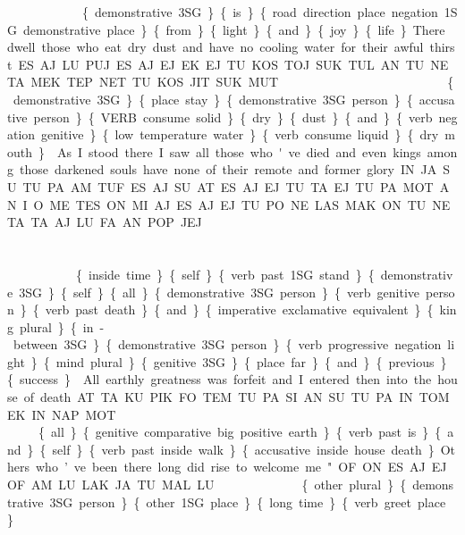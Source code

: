 {\es\aj \si \lol\li\lu\Atlanne\am\es\lu \pu \las \an \sus \fin

\{demonstrative 3SG\} \{is\} \{road direction place negation 1SG demonstrative place\} \{from\} \{light\} \{and\} \{joy\} \{life\} 

 
 

There dwell those who eat dry dust and have no cooling water for their awful thirst.  
 ES.AJ LU.PUJ ES.AJ.EJ EK.EJ TU.KOS.TOJ SUK TUL AN TU.NE.TA MEK.TEP.NET TU.KOS.JIT SUK.MUT 

\es\aj \lu\puj \es\aj\ej \ek\ek \tu\kos\toj \suk \tul \an \tu\Atlanne\ta \mek\tep\net \tu\kos\jit \suk\mut

\{demonstrative 3SG\} \{place stay\} \{demonstrative 3SG person\} \{accusative person\} \{VERB consume solid\} \{dry\} \{dust\} \{and\} \{verb negation genitive\} \{low temperature water\} \{verb consume liquid\} \{dry mouth\} 

 
 

 
 
\pagebreak
As I stood there I saw all those who've died and even kings among those darkened souls have none of their remote and former glory. 

IN.JA SU TU.PA.AM.TUF ES.AJ SU AT ES.AJ.EJ TU.TA.EJ TU.PA.MOT AN I.O.ME TES.ON MI.AJ ES.AJ.EJ TU.PO.NE.LAS MAK.ON TU.NE.TA TA.AJ LU.FA AN POP JEJ 

\Atlanin\ja \su \tu\pa\am\tuf \es\aj \su \at \es\aj\ej \\\tu\ta\ej \tu\pa\mot \an \Atlani\Atlano\me \\ \tes\on \mi\aj \es\aj\ej \tu\po\Atlanne\las \mak\on \\ \tu\Atlanne\ta \ta\taj \lu\fa \an \pop \jej


\{inside time\} \{self\} \{verb past 1SG stand\} \{demonstrative 3SG\} \{self\} \{all\} \{demonstrative 3SG person\} \{verb genitive person\} \{verb past death\} \{and\} \{imperative exclamative equivalent\} \{king plural\} \{in-between 3SG\} \{demonstrative 3SG person\} \{verb progressive negation light\} \{mind plural\} \{genitive 3SG\} \{place far\} \{and\} \{previous\} \{success\} 

 
\drie 

All earthly greatness was forfeit and I entered then into the house of death.  

AT TA.KU.PIK.FO.TEM TU.PA.SI AN SU TU.PA.IN.TOM EK.IN.NAP.MOT 

\at \ta\ku\pik\fo\tem \tu\pa\si \an \su \tu\pa\Atlanin\tom \\\ek\Atlanin\nap\mot

\{all\} \{genitive comparative big positive earth\} \{verb past is\} \{and\} \{self\} \{verb past inside walk\} \{accusative inside house death\} 

 
 

Others who’ve been there long did rise to welcome me." 

OF.ON ES.AJ.EJ OF.AM.LU LAK.JA TU.MAL.LU 

\of\on \es\aj\ej \of\am\lu \lak\ja \tu\mal\lu

\{other plural\} \{demonstrative 3SG person\} \{other 1SG place\} \{long time\} \{verb greet place\} 



}

